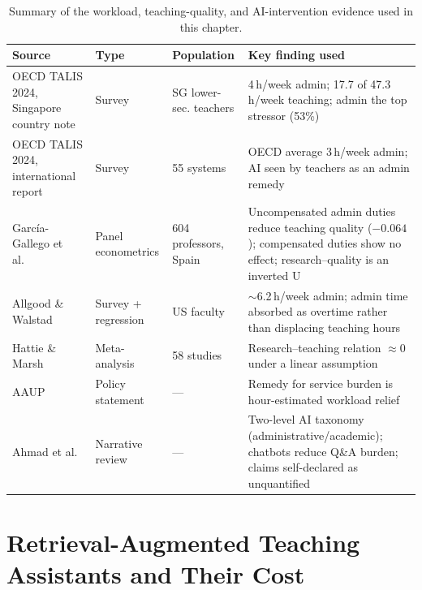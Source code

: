 \begin{table}[htb]
  \centering
  \caption{Summary of the workload, teaching-quality, and AI-intervention
           evidence used in this chapter.}
  \label{review:tab:findings}
  \footnotesize
  \renewcommand{\arraystretch}{1.3}
  \begin{tabular}{L{0.21\textwidth} L{0.13\textwidth} L{0.14\textwidth} L{0.4\textwidth}}
    \hline
    \textbf{Source} & \textbf{Type} & \textbf{Population} & \textbf{Key finding used} \\
    \hline
    OECD TALIS 2024, Singapore country note~\cite{oecd25:TalisSG} &
      Survey &
      SG lower-sec. teachers &
      4\,h/week admin; 17.7 of 47.3\,h/week teaching; admin the top stressor
      (53\%) \\
    OECD TALIS 2024, international report~\cite{oecd25:Talis} &
      Survey &
      55 systems &
      OECD average 3\,h/week admin; AI seen by teachers as an admin
      remedy \\
    García-Gallego et al.~\cite{apec15:GarciaGallego} &
      Panel econometrics &
      604 professors, Spain &
      Uncompensated admin duties reduce teaching quality ($-0.064$);
      compensated duties show no effect; research--quality is an inverted U \\
    Allgood \& Walstad~\cite{wp07:Allgood, aer13:Allgood} &
      Survey + regression &
      US faculty &
      $\sim$6.2\,h/week admin; admin time absorbed as overtime rather than
      displacing teaching hours \\
    Hattie \& Marsh~\cite{rer96:Hattie} &
      Meta-analysis &
      58 studies &
      Research--teaching relation $\approx 0$ under a linear assumption \\
    AAUP~\cite{aaup00:Workload} &
      Policy statement &
      --- &
      Remedy for service burden is hour-estimated workload relief \\
    Ahmad et al.~\cite{sust22:Ahmad} &
      Narrative review &
      --- &
      Two-level AI taxonomy (administrative/academic); chatbots reduce Q\&A
      burden; claims self-declared as unquantified \\
    \hline
  \end{tabular}
\end{table}

\FloatBarrier
\section{Retrieval-Augmented Teaching Assistants and Their Cost}
\label{review:sec:rag}

